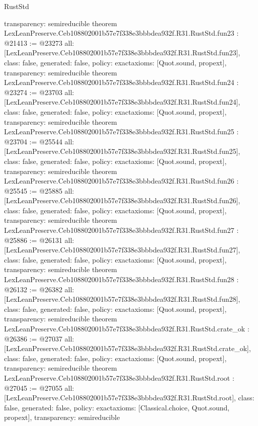 \begin{lexlean}{RustStd}
\begin{coremodule}
{  transparency: semireducible
}
theorem LexLeanPreserve.Ceb108802001b57e7f338e3bbbdea932f.R31.RustStd.fun23 : @21413 := @23273 {
  all: [LexLeanPreserve.Ceb108802001b57e7f338e3bbbdea932f.R31.RustStd.fun23],
  class: false,
  generated: false,
  policy: exact{axioms: [Quot.sound, propext]},
  transparency: semireducible
}
theorem LexLeanPreserve.Ceb108802001b57e7f338e3bbbdea932f.R31.RustStd.fun24 : @23274 := @23703 {
  all: [LexLeanPreserve.Ceb108802001b57e7f338e3bbbdea932f.R31.RustStd.fun24],
  class: false,
  generated: false,
  policy: exact{axioms: [Quot.sound, propext]},
  transparency: semireducible
}
theorem LexLeanPreserve.Ceb108802001b57e7f338e3bbbdea932f.R31.RustStd.fun25 : @23704 := @25544 {
  all: [LexLeanPreserve.Ceb108802001b57e7f338e3bbbdea932f.R31.RustStd.fun25],
  class: false,
  generated: false,
  policy: exact{axioms: [Quot.sound, propext]},
  transparency: semireducible
}
theorem LexLeanPreserve.Ceb108802001b57e7f338e3bbbdea932f.R31.RustStd.fun26 : @25545 := @25885 {
  all: [LexLeanPreserve.Ceb108802001b57e7f338e3bbbdea932f.R31.RustStd.fun26],
  class: false,
  generated: false,
  policy: exact{axioms: [Quot.sound, propext]},
  transparency: semireducible
}
theorem LexLeanPreserve.Ceb108802001b57e7f338e3bbbdea932f.R31.RustStd.fun27 : @25886 := @26131 {
  all: [LexLeanPreserve.Ceb108802001b57e7f338e3bbbdea932f.R31.RustStd.fun27],
  class: false,
  generated: false,
  policy: exact{axioms: [Quot.sound, propext]},
  transparency: semireducible
}
theorem LexLeanPreserve.Ceb108802001b57e7f338e3bbbdea932f.R31.RustStd.fun28 : @26132 := @26382 {
  all: [LexLeanPreserve.Ceb108802001b57e7f338e3bbbdea932f.R31.RustStd.fun28],
  class: false,
  generated: false,
  policy: exact{axioms: [Quot.sound, propext]},
  transparency: semireducible
}
theorem LexLeanPreserve.Ceb108802001b57e7f338e3bbbdea932f.R31.RustStd.crate_ok : @26386 := @27037 {
  all: [LexLeanPreserve.Ceb108802001b57e7f338e3bbbdea932f.R31.RustStd.crate_ok],
  class: false,
  generated: false,
  policy: exact{axioms: [Quot.sound, propext]},
  transparency: semireducible
}
theorem LexLeanPreserve.Ceb108802001b57e7f338e3bbbdea932f.R31.RustStd.root : @27045 := @27055 {
  all: [LexLeanPreserve.Ceb108802001b57e7f338e3bbbdea932f.R31.RustStd.root],
  class: false,
  generated: false,
  policy: exact{axioms: [Classical.choice, Quot.sound, propext]},
  transparency: semireducible
}


\end{coremodule}
\end{lexlean}
